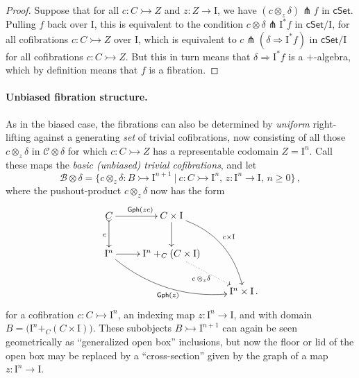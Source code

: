 \documentclass[11pt]{article}
\newcommand{\cSet}{\ensuremath{\mathsf{cSet}}}
\newcommand{\mono}{\ensuremath{\rightarrowtail}}
\newcommand{\ra}{\ensuremath{\rightarrow}}
\newcommand{\I}{\ensuremath{\mathrm{I}}}
\theoremstyle{remark}
\theoremstyle{definition}
\begin{document}
\begin{proof}
Suppose that for all $c : C\mono Z$ and $z:Z\ra\I$, we have $(c\otimes_z\delta) \pitchfork f$ in $\cSet$. Pulling $f$ back over $\I$, this is equivalent to the condition $c\otimes\delta \pitchfork \I^*f$ in $\cSet/\I$, for all cofibrations $c : C\mono Z$ over $\I$, which is equivalent to $c\pitchfork(\delta\Rightarrow \I^*f)$ in $\cSet/\I$ for all cofibrations $c : C\mono Z$.  But this in turn means that $\delta\Rightarrow\I^*f$ is a $+$-algebra, which by definition means that $f$ is a fibration.
\end{proof}

\paragraph{Unbiased fibration structure.}

As in the biased case, the fibrations can also be determined by \emph{uniform} right-lifting against a generating \emph{set} of trivial cofibrations, now consisting of all those $c \otimes_z \delta$ in $\mathcal{C}\otimes \delta$ for which $c : C \mono Z$ has a representable codomain $Z=\I^n$.  Call these maps the \emph{basic (unbiased) trivial cofibrations}, and let 
\begin{equation}\label{eq:basicunbiasedtrivcof}
\mathcal{B}\otimes \delta = \{c \otimes_z \delta : B \mono \I^{n+1}\ |\ c : C\mono \I^n,\, z : \I^n \ra \I,\,n\geq 0\}\,,
\end{equation}
where the pushout-product $c\otimes_z \delta$ now has the form
\begin{equation}\label{diagram:unbiasedbasicpushoutproduct}
\xymatrix{
C \ar@{>->}[d]_{c} \ar[r]^{\mathsf{Gph}(zc)} & C\times \I \ar[d] \ar@/^4ex/ [rdd]^{c\times\I}\\
\I^n \ar@/_4ex/ [rrd]_{\mathsf{Gph}(z)} \ar[r] &  \I^n +_C (C\times\I) \ar@{.>}[rd]_{c\, \otimes_z \delta} \\
&& \I^n\times\I\,.
}
\end{equation}
for a cofibration $c : C\mono \I^n$, an indexing map $z : \I^n \ra \I$, and with domain $B = \big(\I^n +_C (C\times\I)\big)$.   These subobjects $B \mono \I^{n+1}$ can again be seen geometrically as ``generalized open box'' inclusions, but now the floor or lid of the open box may be replaced by a ``cross-section'' given by the graph of a map $z:\I^n\to \I$.
\end{document}
